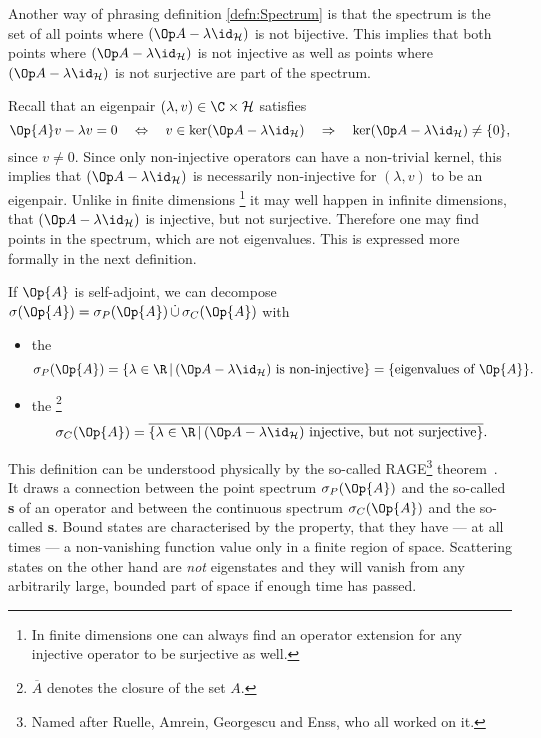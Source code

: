 Another way of phrasing definition \vref{defn:Spectrum} is that
the spectrum is the set of all points where $\shiftop$ is not bijective.
This implies that both points where $\shiftop$ is not injective
as well as points where $\shiftop$ is not surjective are part of the spectrum.

Recall that an eigenpair $(\lambda, v) \in \C \times \hilbert$ satisfies
\[ \Op{A} v - \lambda v = 0 \quad \Leftrightarrow \quad v \in \ker \shiftop \quad \Rightarrow \quad \ker \shiftop \neq \{0\}, \]
since $v \neq 0$.
Since only non-injective operators can have a non-trivial kernel,
this implies that $\shiftop$ is necessarily non-injective
for $(\lambda, v)$ to be an eigenpair.
Unlike in finite dimensions%
\footnote{In finite dimensions one can always find an operator extension for any
injective operator to be surjective as well.}
it may well happen in infinite dimensions, that $\shiftop$ is injective,
but not surjective.
Therefore one may find points in the spectrum, which are not eigenvalues.
This is expressed more formally in the next definition.

\begin{defn}
	If $\Op{A}$ is self-adjoint, we can decompose
	$\sigma(\Op{A}) = \sigma_P(\Op{A}) \, \dot{\cup} \, \sigma_C(\Op{A})$
	with
	\begin{itemize}
		\item the 
			\[ \sigma_P(\Op{A}) = \left\{ \lambda \in \R \, \middle|
				\, \shiftop\ \text{is non-injective} \right\}
				= \{ \text{eigenvalues of $\Op{A}$} \}.\]
		\item the %
			\footnote{$\overline{A}$ denotes the closure of the set $A$.}
			\[ \sigma_C(\Op{A}) = \overline{\left\{ \lambda \in \R \, \middle|\, \shiftop\ \text{injective, but not surjective} \right\}}.\]
	\end{itemize}
\end{defn}
This definition can be understood physically by the so-called
RAGE\footnote{Named after Ruelle, Amrein, Georgescu and Enss, who all worked on it.}
theorem~\cite{Last1996}.
It draws
a connection between the point spectrum $\sigma_P(\Op{A})$
and the so-called \textbf{s} of an operator
and between the continuous spectrum $\sigma_C(\Op{A})$
and the so-called \textbf{s}.
Bound states are characterised by the property,
that they have --- at all times --- a non-vanishing function value
only in a finite region of space.
Scattering states on the other hand are \emph{not} eigenstates
and they will vanish from any arbitrarily large, bounded part of space
if enough time has passed.

